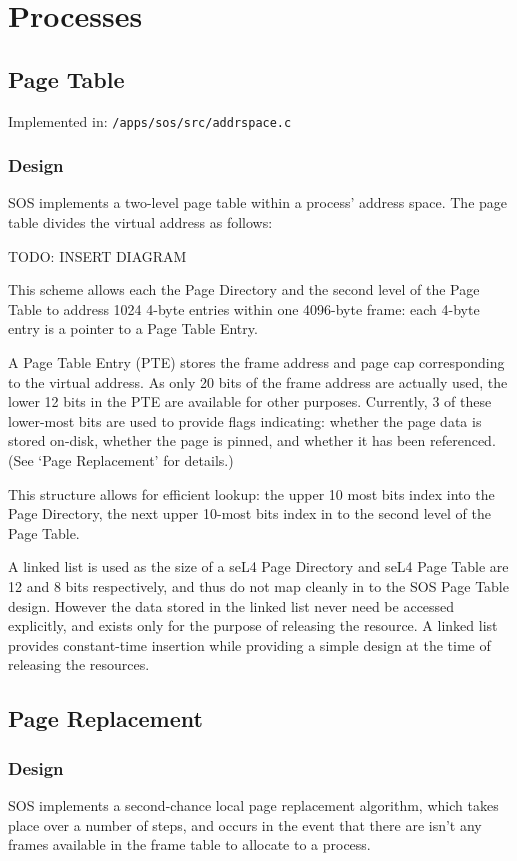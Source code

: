 \documentclass[a4paper,12pt]{article}
\begin{document}
\section{Processes}
\subsection{Page Table}
Implemented in: \texttt{/apps/sos/src/addrspace.c}

\subsubsection{Design}
SOS implements a two-level page table within a process' address space.  The
page table divides the virtual address as follows:

TODO: INSERT DIAGRAM

This scheme allows each the Page Directory and the second level of the Page
Table to address 1024 4-byte entries within one 4096-byte frame: each 4-byte
entry is a pointer to a Page Table Entry.

A Page Table Entry (PTE) stores the frame address and page cap corresponding
to the virtual address.  As only 20 bits of the frame address are actually
used, the lower 12 bits in the PTE are available for other purposes.
Currently, 3 of these lower-most bits are used to provide flags indicating:
whether the page data is stored on-disk, whether the page is pinned, and
whether it has been referenced.  (See `Page Replacement' for details.)

This structure allows for efficient lookup: the upper 10 most bits index into
the Page Directory, the next upper 10-most bits index in to the second level
of the Page Table.

A linked list is used as the size of a seL4 Page Directory and seL4 Page Table
are 12 and 8 bits respectively, and thus do not map cleanly in to the SOS Page
Table design.  However the data stored in the linked list never need be
accessed explicitly, and exists only for the purpose of releasing the
resource.  A linked list provides constant-time insertion while providing a
simple design at the time of releasing the resources.

\subsection{Page Replacement}
\subsubsection{Design}
SOS implements a second-chance local page replacement algorithm, which takes
place over a number of steps, and occurs in the event that there are isn't any
frames available in the frame table to allocate to a process.
\end{document}
